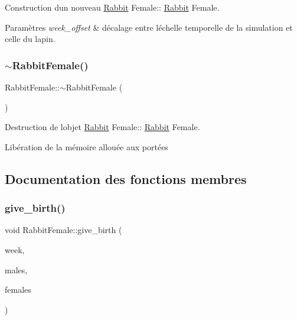 Construction d\textquotesingle{}un nouveau \hyperlink{classRabbit}{Rabbit} Female\+:\+: \hyperlink{classRabbit}{Rabbit} Female. 


\begin{DoxyParams}{Paramètres}
{\em week\+\_\+offset} & décalage entre l\textquotesingle{}échelle temporelle de la simulation et celle du lapin. \\
\hline
\end{DoxyParams}
\mbox{\label{classRabbitFemale_a647e3ccc4f2def58440a8faf2855d579}} 
\subsubsection{\texorpdfstring{$\sim$\+Rabbit\+Female()}{~RabbitFemale()}}
{\footnotesize\ttfamily Rabbit\+Female\+::$\sim$\+Rabbit\+Female (\begin{DoxyParamCaption}{ }\end{DoxyParamCaption})}



Destruction de l\textquotesingle{}objet \hyperlink{classRabbit}{Rabbit} Female\+:\+: \hyperlink{classRabbit}{Rabbit} Female. 

Libération de la mémoire allouée aux portées 

\subsection{Documentation des fonctions membres}
\mbox{\label{classRabbitFemale_adc6ed8ce0605e19fcbc2c21ac43db8ee}} 
\subsubsection{\texorpdfstring{give\+\_\+birth()}{give\_birth()}}
{\footnotesize\ttfamily void Rabbit\+Female\+::give\+\_\+birth (\begin{DoxyParamCaption}\item[{unsigned int}]{week,  }\item[{std\+::list$<$ \hyperlink{classRabbit}{Rabbit} $\ast$$>$ \&}]{males,  }\item[{std\+::list$<$ \hyperlink{classRabbitFemale}{Rabbit\+Female} $\ast$$>$ \&}]{females }\end{DoxyParamCaption})}



